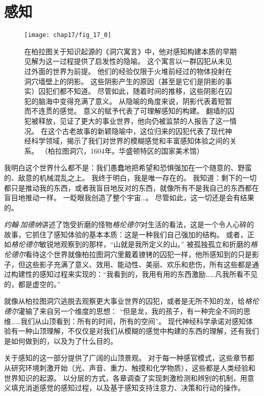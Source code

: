 \part{感知}

\begin{figure}[htbp]
	\centering
	\texttt{[image: chap17/fig\_17\_0]}
	\caption{在柏拉图关于知识起源的《洞穴寓言》中，他对感知构建本质的早期见解为这一过程提供了启发性的隐喻。
		这个寓言以一群囚犯从未见过外面的世界为前提。
		他们的经验仅限于火堆前经过的物体投射在洞穴墙壁上的阴影。
		这些阴影产生的原因（甚至是它们是阴影的事实）囚犯们都不知道。
		尽管如此，随着时间的推移，这些阴影在囚犯的脑海中变得充满了意义。
		从隐喻的角度来说，阴影代表着短暂而不连贯的感觉。
		意义的赋予代表了可理解感知的构建。
		翻墙的囚犯被释放，见证了更大的事业世界，他向仍被监禁的人报告了这一情况。
		在这个古老故事的新颖隐喻中，这位归来的囚犯代表了现代神经科学领域，揭示了我们对世界的模糊感觉和丰富感知体验之间的关系。
		（柏拉图洞穴，1604年。华盛顿特区的国家美术馆）}
	\label{fig:17_0}
\end{figure}


我明白这个世界什么都不是：我们愚蠢地把希望和恐惧强加在一个随意的、野蛮的、敌意的机械混乱之上。
我终于明白，我是唯一存在的。
我知道：剩下的一切都只是推动我的东西，或者我盲目地反对的东西，就像所有不是我自己的东西都在盲目地推动一样。
一眨眼我创造了整个宇宙…。
尽管如此，这一切还是会有结果的\cite{gardner2015grendel}。


\textit{约翰$\cdot$加德纳}讲述了饱受折磨的怪物\textit{格伦德尔}对生活的看法，这是一个令人心碎的故事，它抓住了感知体验的基本本质：这是一种我们自己强加的结构。
或者，正如\textit{格伦德尔}敏锐地观察到的那样，“山就是我所定义的山。”
被孤独孤立和折磨的\textit{格伦德尔}看待这个世界就像柏拉图洞穴里戴着镣铐的囚犯一样，他所感知到的只是影子，但这些影子充满了意义、效用、能动性、美丽、欢乐和悲伤，所有这些都是通过构建性的感知过程来实现的：“我看到的，我用有用的东西激励……凡我所看不见的，都是虚空的。”


就像从柏拉图洞穴逃脱去观察更大事业世界的囚犯，或者是无所不知的龙，给\textit{格伦德尔}灌输了来自另一个维度的思想：
“但是龙，我的孩子，有一种完全不同的思维……我们从山顶看到：所有的时间，所有的空间”。
现代神经科学承诺对感知体验有一种山顶理解，不仅仅是对我们从模糊的感觉中构建的东西的理解，还有我们是如何做到的，以及为了什么目的。


关于感知的这一部分提供了广阔的山顶景观。
对于每一种感官模式，这些章节都从研究环境刺激开始（光、声音、重力、触摸和化学物质），这些都是人类经验和世界知识的起源。
以分层的方式，各章调查了实现刺激检测和辨别的机制，用意义填充消逝感觉的感知过程，以及基于感知支持注意力、决策和行动的操作。


